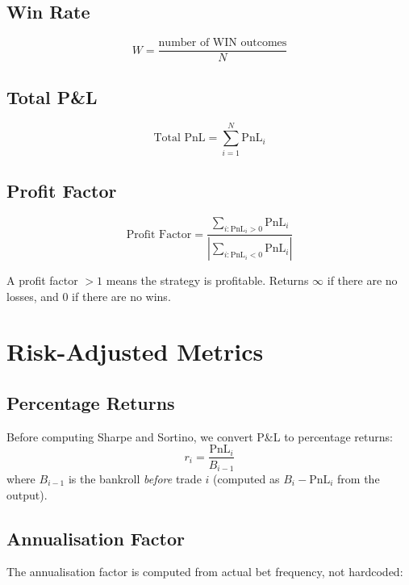 \documentclass[12pt,a4paper]{report}
\theoremstyle{definition}
\newcommand{\pnl}{\text{PnL}}
\begin{document}
\subsection{Win Rate}
\begin{equation}
    W = \frac{\text{number of WIN outcomes}}{N}
\end{equation}

\subsection{Total P\&L}
\begin{equation}
    \text{Total PnL} = \sum_{i=1}^{N} \pnl_i
\end{equation}

\subsection{Profit Factor}
\begin{equation}
    \text{Profit Factor} = \frac{\sum_{i : \pnl_i > 0} \pnl_i}{\left|\sum_{i : \pnl_i < 0} \pnl_i\right|}
    \label{eq:profit-factor}
\end{equation}

A profit factor $> 1$ means the strategy is profitable. Returns $\infty$ if there are no losses, and $0$ if there are no wins.

\section{Risk-Adjusted Metrics}

\subsection{Percentage Returns}

Before computing Sharpe and Sortino, we convert P\&L to percentage returns:
\begin{equation}
    r_i = \frac{\pnl_i}{B_{i-1}}
    \label{eq:pct-return}
\end{equation}
where $B_{i-1}$ is the bankroll \emph{before} trade $i$ (computed as $B_i - \pnl_i$ from the output).

\subsection{Annualisation Factor}
\label{sec:annualisation}

The annualisation factor is computed from actual bet frequency, not hardcoded:
\end{document}
